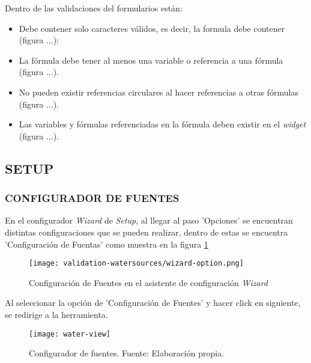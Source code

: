 Dentro de las validaciones del formularios están:
\begin{itemize}
    \item Debe contener solo caracteres válidos, es decir, la formula debe contener (figura ...): 
    \item La fórmula debe tener al menos una variable o referencia a una fórmula (figura ...).
    \item No pueden existir referencias circulares al hacer referencias a otras fórmulas (figura ...).
    \item Las variables y fórmulas referenciadas en la fórmula deben existir en el \textit{widget} (figura ...).        
\end{itemize}
\iffalse
\subsection{SETUP}

\subsubsection{CONFIGURADOR DE FUENTES}

En el configurador \textit{Wizard} de \textit{Setup}, al llegar al paso 'Opciones' se encuentran distintas configuraciones que se pueden realizar, dentro de estas se encuentra 'Configuración de Fuentas' como muestra en la figura \ref{fig:ws-wizard-option}

\begin{figure}[H]
	\centering
	\texttt{[image: validation-watersources/wizard-option.png]}
	\caption{\label{fig:ws-wizard-option} Configuración de Fuentes en el asistente de configuración \textit{Wizard}}
\end{figure}

Al seleccionar la opción de 'Configuración de Fuentes' y hacer click en siguiente, se redirige a la herramienta.

\begin{figure}[H]
	\centering
	\texttt{[image: water-view]}
	\caption{\label{fig:water-view} Configurador de fuentes. Fuente: Elaboración propia.}
\end{figure}

